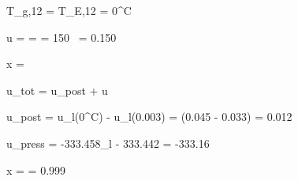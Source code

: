 T_{g,12} = T_{E,12} = 0^\circ C  

\Delta u =  =  = 150 \,  = 0.150 \,   

x =   

u_{tot} = u_{post} + \Delta u  

\Delta u_{post} = u_{l}(0^\circ C) - u_{l}(0.003) = (0.045 - 0.033) = 0.012  

u_{press} = -333.458_{l} - 333.442 = -333.16  

\Delta x =  = 0.999